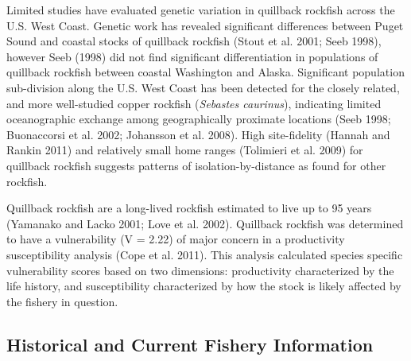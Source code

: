 \documentclass[11pt,
  english,
  letterpaper,
]{article}
\begin{document}
Limited studies have evaluated genetic variation in quillback rockfish across the U.S. West Coast. Genetic work has revealed significant differences between Puget Sound and coastal stocks of quillback rockfish {(Stout et al. 2001; Seeb 1998)\leavevmode\tagmcend\tagstructend}, however Seeb {(1998)\leavevmode\tagmcend\tagstructend} did not find significant differentiation in populations of quillback rockfish between coastal Washington and Alaska. Significant population sub-division along the U.S. West Coast has been detected for the closely related, and more well-studied copper rockfish (\emph{Sebastes caurinus}), indicating limited oceanographic exchange among geographically proximate locations {(Seeb 1998; Buonaccorsi et al. 2002; Johansson et al. 2008)\leavevmode\tagmcend\tagstructend}. High site-fidelity {(Hannah and Rankin 2011)\leavevmode\tagmcend\tagstructend} and relatively small home ranges {(Tolimieri et al. 2009)\leavevmode\tagmcend\tagstructend} for quillback rockfish suggests patterns of isolation-by-distance as found for other rockfish.

\leavevmode\tagmcend\tagstructend\par


Quillback rockfish are a long-lived rockfish estimated to live up to 95 years {(Yamanako and Lacko 2001; Love et al. 2002)\leavevmode\tagmcend\tagstructend}. Quillback rockfish was determined to have a vulnerability (V = 2.22) of major concern in a productivity susceptibility analysis {(Cope et al. 2011)\leavevmode\tagmcend\tagstructend}. This analysis calculated species specific vulnerability scores based on two dimensions: productivity characterized by the life history, and susceptibility characterized by how the stock is likely affected by the fishery in question.

\leavevmode\tagmcend\tagstructend\par


\hypertarget{historical-and-current-fishery-information}{%
\subsection{Historical and Current Fishery Information}\label{historical-and-current-fishery-information}}
\end{document}
